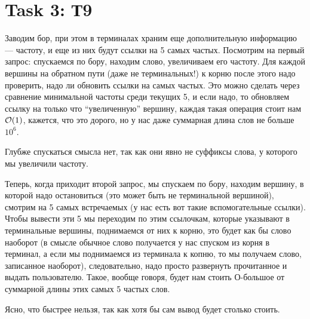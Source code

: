 \section{Task 3: Т9}
\begin{solution}
    Заводим бор, при этом в терминалах храним еще дополнительную информацию --- частоту, и еще из них будут ссылки на 5 самых частых.
    Посмотрим на первый запрос: спускаемся по бору, находим слово, увеличиваем его частоту.
    Для каждой вершины на обратном пути (даже не терминальных!) к корню после этого надо проверить, надо ли обновить ссылки на самых частых. Это можно сделать через сравнение минимальной частоты среди текущих 5, и если надо, то обновляем ссылку на только что ``увеличенную'' вершину, каждая такая операция стоит нам $\mathcal{O}(1)$, кажется, что это дорого, но у нас даже суммарная длина слов не больше $10^6$.

    \begin{remark}
        Глубже спускаться смысла нет, так как они явно не суффиксы слова, у которого мы увеличили частоту.
    \end{remark}

    Теперь, когда приходит второй запрос, мы спускаем по бору, находим вершину, в которой надо остановиться (это может быть не терминальной вершиной), смотрим на 5 самых встречаемых (у нас есть вот такие вспомогательные ссылки).
    Чтобы вывести эти 5 мы переходим по этим ссылочкам, которые указывают в терминальные вершины, поднимаемся от них к корню, это будет как бы слово наоборот (в смысле обычное слово получается у нас спуском из корня в терминал, а если мы поднимаемся из терминала к копню, то мы получаем слово, записанное наоборот), следовательно, надо просто развернуть прочитанное и выдать пользователю. Такое, вообще говоря, будет нам стоить О-большое от суммарной длины этих самых 5 частых слов.

    \begin{remark}
        Ясно, что быстрее нельзя, так как хотя бы сам вывод будет столько стоить.
    \end{remark}
\end{solution}